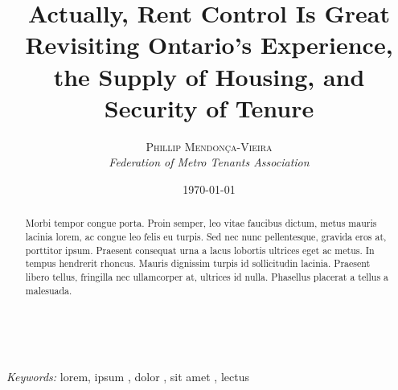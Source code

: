\documentclass[letterpaper,12pt]{article} %
\title{\textsf{\textbf{Actually, Rent Control Is Great}\\ %
Revisiting Ontario's Experience, the Supply of Housing, and Security of Tenure}} %
\author{\textsc{Phillip Mendonça-Vieira} %
\\{\textit{Federation of Metro Tenants Association}}} %
\date{\today} %
\makeatletter
\renewcommand{\maketitle}{ %
\begin{flushright} %
{\LARGE\@title} %

\vspace{50pt} %

{\large\@author} %
\\\@date %

\vspace{40pt} %
\end{flushright}
}
\makeatother
\begin{document}
\maketitle %


\renewcommand{\abstractname}{\sffamily{Abstract}} %

\begin{abstract}
Morbi tempor congue porta. Proin semper, leo vitae faucibus dictum, metus mauris lacinia lorem, ac congue leo felis eu turpis. Sed nec nunc pellentesque, gravida eros at, porttitor ipsum. Praesent consequat urna a lacus lobortis ultrices eget ac metus. In tempus hendrerit rhoncus. Mauris dignissim turpis id sollicitudin lacinia. Praesent libero tellus, fringilla nec ullamcorper at, ultrices id nulla. Phasellus placerat a tellus a malesuada.
\end{abstract}

\hspace*{3,6mm}\textit{Keywords:} lorem, ipsum , dolor , sit amet , lectus %

\vspace{30pt} %


{\sffamily\tableofcontents}
\setcounter{secnumdepth}{-2}

\let\oldnumberline\numberline%
\renewcommand{\numberline}[1]{\hspace*{-1.5em}}%
\listoffigures
\let\numberline\oldnumberline%






\end{document}
